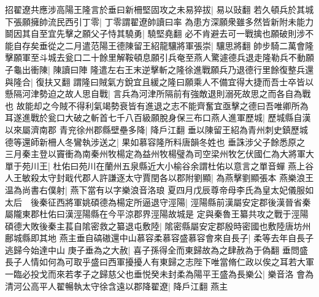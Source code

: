招翟遼共應涉高陽王隆言於垂曰新柵堅固攻之未易猝拔|{
	易以䜴翻}
若久頓兵於其城下張願擁帥流民西引丁零|{
	丁零謂翟遼帥讀曰率}
為患方深願衆雖多然皆新附未能力鬬因其自至宜先擊之願父子恃其驍勇|{
	驍堅堯翻}
必不肯避去可一戰擒也願破則涉不能自存矣垂從之二月遣范陽王德陳留王紹龍驤將軍張崇|{
	驤思將翻}
帥步騎二萬會隆擊願軍至斗城去瓮口二十餘里解鞍頓息願引兵奄至燕人驚遽德兵退走隆勒兵不動願子龜出衝陳|{
	陳讀曰陣}
隆遣左右王末逆擊斬之隆徐進戰願兵乃退德行里餘復整兵還與隆合|{
	復扶又翻}
謂隆曰賊氣方銳宜且緩之隆曰願乘人不備宜得大捷而吾士卒皆以懸隔河津勢迫之故人思自戰|{
	言兵為河津所隔前有強敵退則溺死故思之而各自為戰也}
故能却之今賊不得利氣竭勢衰皆有進退之志不能齊奮宜亟擊之德曰吾唯卿所為耳遂進戰於瓮口大破之斬首七千八百級願脫身保三布口燕人進軍歷城|{
	歷城縣自漢以來屬濟南郡}
青兖徐州郡縣壁壘多降|{
	降戶江翻}
垂以陳留王紹為青州刺史鎮歷城德等還師新柵人冬鸞執涉送之|{
	果如慕容隆所料唐韻冬姓也}
垂誅涉父子餘悉原之　三月秦主登以竇衝為南秦州牧楊定為益州牧楊璧為司空梁州牧乞伏國仁為大將軍大單于苑川王|{
	杜佑曰苑川在蘭州五泉縣近大小榆谷余謂杜佑以意言之單音蟬}
燕上谷人王敏殺太守封戢代郡人許謙逐太守賈閏各以郡附劉顯|{
	為燕擊劉顯張本}
燕樂浪王温為尚書右僕射|{
	燕下當有以字樂浪音洛琅}
夏四月戊辰尊帝母李氏為皇太妃儀服如太后　後秦征西將軍姚碩德為楊定所逼退守涇陽|{
	涇陽縣前漢屬安定郡後漢晉省秦屬隴東郡杜佑曰漢涇陽縣在今平涼郡界涇陽故城是}
定與秦魯王纂共攻之戰于涇陽碩德大敗後秦主萇自隂密救之纂退屯敷陸|{
	隂密縣屬安定郡殷時密國也敷陸唐坊州鄜城縣即其地}
燕主垂自碻磝還中山慕容柔慕容盛慕容會來自長子|{
	柔等去年自長子逃歸今始達中山}
庚子垂為之大赦|{
	喜子孫得全而東歸故為之肆赦為于偽翻}
垂問盛長子人情如何為可取乎盛曰西軍擾擾人有東歸之志陛下唯當脩仁政以俟之耳若大軍一臨必投戈而來若孝子之歸慈父也垂悦癸未封柔為陽平王盛為長樂公|{
	樂音洛}
會為清河公高平人翟暢執太守徐含遠以郡降翟遼|{
	降戶江翻}
燕主

